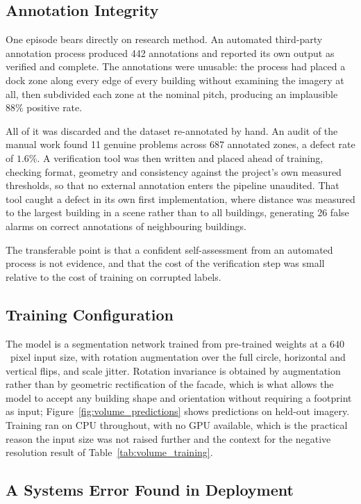 \subsection*{Annotation Integrity}

One episode bears directly on research method. An automated third-party annotation process
produced 442 annotations and reported its own output as verified and complete. The
annotations were unusable: the process had placed a dock zone along every edge of every
building without examining the imagery at all, then subdivided each zone at the nominal
pitch, producing an implausible $88\%$ positive rate.

All of it was discarded and the dataset re-annotated by hand. An audit of the manual work
found 11 genuine problems across 687 annotated zones, a defect rate of $1.6\%$. A
verification tool was then written and placed ahead of training, checking format, geometry
and consistency against the project's own measured thresholds, so that no external
annotation enters the pipeline unaudited. That tool caught a defect in its own first
implementation, where distance was measured to the largest building in a scene rather than to
all buildings, generating 26 false alarms on correct annotations of neighbouring buildings.

The transferable point is that a confident self-assessment from an automated process is not
evidence, and that the cost of the verification step was small relative to the cost of
training on corrupted labels.

\subsection*{Training Configuration}

The model is a segmentation network trained from pre-trained weights at a $640$~pixel input
size, with rotation augmentation over the full circle, horizontal and vertical flips, and
scale jitter. Rotation invariance is obtained by augmentation rather than by geometric
rectification of the facade, which is what allows the model to accept any building shape and
orientation without requiring a footprint as input; Figure~\ref{fig:volume_predictions} shows
predictions on held-out imagery. Training ran on CPU throughout, with no
GPU available, which is the practical reason the input size was not raised further and the
context for the negative resolution result of Table~\ref{tab:volume_training}.

\subsection*{A Systems Error Found in Deployment}


